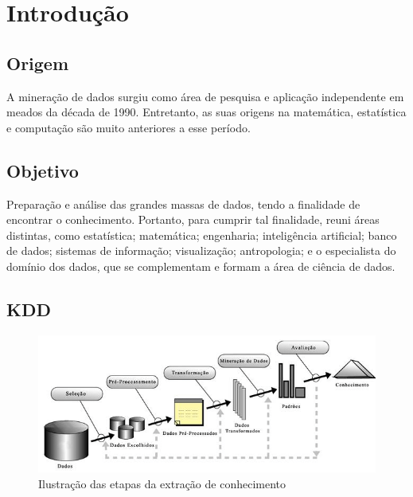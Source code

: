 \section{Introdução}

\subsection*{Origem}
A mineração de dados surgiu como área de pesquisa e aplicação independente em meados da década de 1990.
Entretanto, as suas origens na matemática, estatística e computação são muito anteriores a esse período.

\subsection*{Objetivo}
Preparação e análise das grandes massas de dados, tendo a finalidade de encontrar o conhecimento.
Portanto, para cumprir tal finalidade, reuni áreas distintas, como estatística; matemática; engenharia; inteligência artificial; banco de dados; sistemas de informação; visualização; antropologia; e o especialista do domínio dos dados, que se complementam e formam a área de ciência de dados.

\subsection*{KDD}

\begin{figure}[!htp]
	\centering
	\includegraphics[scale=.65]{../img/kdd/pt.png}
	\caption{Ilustração das etapas da extração de conhecimento}
	\label{img:kdd}
\end{figure}

